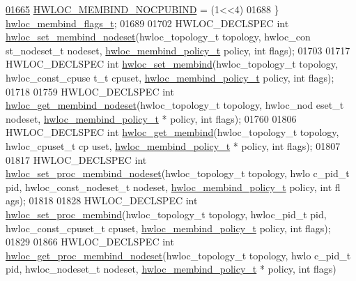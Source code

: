 \begin{DoxyCode}
\hypertarget{a00033_source_l01665}{}\hyperlink{a00050_ggab00475fd98815bf4fb9aaf752030e7d2aad6b9eaf2ee324ca58dc8f58094b9997}{01665}   \hyperlink{a00050_ggab00475fd98815bf4fb9aaf752030e7d2aad6b9eaf2ee324ca58dc8f58094b9997}{HWLOC_MEMBIND_NOCPUBIND} =     (1<<4)  
01688 \} \hyperlink{a00050_gab00475fd98815bf4fb9aaf752030e7d2}{hwloc_membind_flags_t};
01689 
01702 HWLOC\_DECLSPEC \textcolor{keywordtype}{int} \hyperlink{a00050_ga747962cbb16fd12ad6d126011c734a27}{hwloc_set_membind_nodeset}(hwloc\_topology\_t topology, hwloc\_con
      st\_nodeset\_t nodeset, \hyperlink{a00050_gac9764f79505775d06407b40f5e4661e8}{hwloc_membind_policy_t} policy, \textcolor{keywordtype}{int} flags);
01703 
01717 HWLOC\_DECLSPEC \textcolor{keywordtype}{int} \hyperlink{a00050_ga8b6d1d90227aff8e44ef26bc1f8a8f95}{hwloc_set_membind}(hwloc\_topology\_t topology, hwloc\_const\_cpuse
      t\_t cpuset, \hyperlink{a00050_gac9764f79505775d06407b40f5e4661e8}{hwloc_membind_policy_t} policy, \textcolor{keywordtype}{int} flags);
01718 
01759 HWLOC\_DECLSPEC \textcolor{keywordtype}{int} \hyperlink{a00050_ga7b46a4ca0b2db9723ca73b0c148ccd93}{hwloc_get_membind_nodeset}(hwloc\_topology\_t topology, hwloc\_nod
      eset\_t nodeset, \hyperlink{a00050_gac9764f79505775d06407b40f5e4661e8}{hwloc_membind_policy_t} * policy, \textcolor{keywordtype}{int} flags);
01760 
01806 HWLOC\_DECLSPEC \textcolor{keywordtype}{int} \hyperlink{a00050_gab07aedba1119f99130e5f0b796b7d8a5}{hwloc_get_membind}(hwloc\_topology\_t topology, hwloc\_cpuset\_t cp
      uset, \hyperlink{a00050_gac9764f79505775d06407b40f5e4661e8}{hwloc_membind_policy_t} * policy, \textcolor{keywordtype}{int} flags);
01807 
01817 HWLOC\_DECLSPEC \textcolor{keywordtype}{int} \hyperlink{a00050_gaf10d18cd4703ec980d7440a1c23fa07f}{hwloc_set_proc_membind_nodeset}(hwloc\_topology\_t topology, hwlo
      c\_pid\_t pid, hwloc\_const\_nodeset\_t nodeset, \hyperlink{a00050_gac9764f79505775d06407b40f5e4661e8}{hwloc_membind_policy_t} policy, \textcolor{keywordtype}{int} fl
      ags);
01818 
01828 HWLOC\_DECLSPEC \textcolor{keywordtype}{int} \hyperlink{a00050_gac63c4517e71b3f0d41b3dee3e83dc55c}{hwloc_set_proc_membind}(hwloc\_topology\_t topology, hwloc\_pid\_t 
      pid, hwloc\_const\_cpuset\_t cpuset, \hyperlink{a00050_gac9764f79505775d06407b40f5e4661e8}{hwloc_membind_policy_t} policy, \textcolor{keywordtype}{int} flags);
01829 
01866 HWLOC\_DECLSPEC \textcolor{keywordtype}{int} \hyperlink{a00050_ga22074ed072e1039f74f17f7b16e9e39d}{hwloc_get_proc_membind_nodeset}(hwloc\_topology\_t topology, hwlo
      c\_pid\_t pid, hwloc\_nodeset\_t nodeset, \hyperlink{a00050_gac9764f79505775d06407b40f5e4661e8}{hwloc_membind_policy_t} * policy, \textcolor{keywordtype}{int} flags)

\end{DoxyCode}
